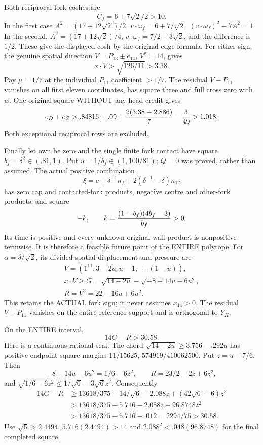 \documentclass[11pt]{article}
\begin{document}
Both reciprocal fork coshes are
\[
                         C_f=6+7\sqrt2/2>10 .
\]
In the first case
\(A^2=(17+12\sqrt2)/2\),
\(v\cdot\omega_f=6+7/\sqrt2\),
\((v\cdot\omega_f)^2-7A^2=1\).
In the second,
\(A^2=(17+12\sqrt2)/4\),
\(v\cdot\omega_f=7/2+3\sqrt2\),
and the difference is \(1/2\).
These give the displayed cosh by the original
edge formula.
For either sign, the genuine spatial direction
\(V=P_{13}\pm e_{14}\), \(V^2=14\), gives
\[
                 x\cdot V>\sqrt{126/11}>3.38 .
\]
Pay \(\mu=1/7\) at the individual \(P_{11}\)
coefficient \(>1/7\).
The residual \(V-P_{11}\) vanishes on all first
eleven coordinates, has square three and full
cross zero with \(w\).
One original square WITHOUT any head credit gives
\[
          e_D+e_Z>.84816+.09+
                      {2(3.38-2.886)\over7}-{3\over49}>1.018.
\]
Both exceptional reciprocal rows are excluded.

Finally let own be zero and the single finite fork
contact have square \(b_f=\delta^2\in(.81,1)\).
Put \(u=1/b_f\in(1,100/81)\); \(Q=0\) was proved,
rather than assumed.
The actual positive combination
\[
               \xi=c+\delta^{-1}n_f
                           +2(\delta^{-1}-\delta)n_{12}
\]
has zero cap and contacted-fork products, negative
centre and other-fork products, and square
\[
                   -k,\qquad k={(1-b_f)(4b_f-3)\over b_f}>0 .
\]
Its time is positive and every unknown original-wall
product is nonpositive termwise.
It is therefore a feasible future point of the
ENTIRE polytope.
For \(\alpha=\delta/\sqrt2\), its divided spatial
displacement and pressure are
\[
 \begin{gathered}
 V=(1^{11},3-2u,u-1,\ \pm(1-u)),\\
 x\cdot V\ge G=\sqrt{14-2u}-\sqrt{-8+14u-6u^2},\\
 R=V^2=22-16u+6u^2 .
 \end{gathered}
\]
This retains the ACTUAL fork sign; it never assumes
\(x_{14}>0\).
The residual \(V-P_{11}\) vanishes on the entire
reference support and is orthogonal to \(Y_H\).

On the ENTIRE interval,
\[
                             14G-R>30.58 .
\]
Here is a continuous rational seal.
The chord
\(\sqrt{14-2u}\ge3.756-.292u\)
has positive endpoint-square margins
\(11/15625\), \(574919/410062500\).
Put \(z=u-7/6\).
Then
\[
 -8+14u-6u^2=1/6-6z^2,\qquad
 R=23/2-2z+6z^2,
\]
and
\(\sqrt{1/6-6z^2}\le1/\sqrt6-3\sqrt6z^2\).
Consequently
\[
 \begin{split}
 14G-R
 &\ge13618/375-14/\sqrt6-2.088z+(42\sqrt6-6)z^2\\
 &>13618/375-5.716-2.088z+96.8748z^2\\
 &>13618/375-5.716-.012=2294/75>30.58 .
 \end{split}
\]
Use \(\sqrt6>2.4494\), \(5.716(2.4494)>14\)
and \(2.088^2<.048(96.8748)\) for the final
completed square.
\end{document}
